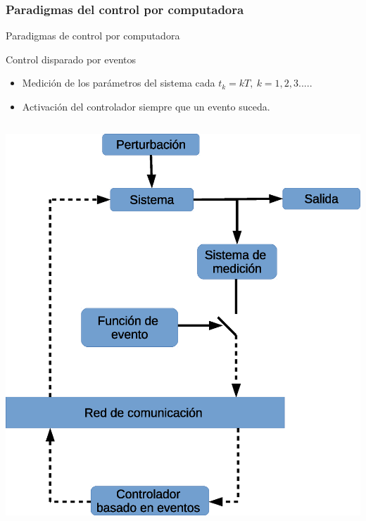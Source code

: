 \subsubsection{Paradigmas del control por computadora}
\begin{frame}[shrink=25]{Paradigmas de control por computadora}
	\vspace{-0.1cm}
	\centering
	\begin{block}{Control disparado por eventos}
		\begin{itemize}
			\item Medición de los parámetros del sistema cada $t_k = kT, ~ k = 1,2,3....$.
			\item Activación del controlador siempre que un evento suceda.
		\end{itemize}
	\end{block}	

	\begin{columns}[T]
		\begin{column}{0.5\textwidth}
			\centering
			\includegraphics[scale=0.4]{Introduccion/EsqCtrlDispEvent.eps}
		\end{column}
		

\end{columns}
\end{frame}
